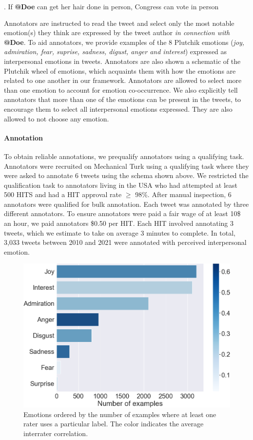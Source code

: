 \ex.\label{ex:doe} If \textbf{@Doe} can get her hair done in person, Congress can vote in person\textellipsis

Annotators are instructed to read the tweet and select only the most notable emotion(s) they think are expressed by the tweet author \emph{in connection with} \textbf{@Doe}. To aid annotators, we provide examples of the 8 Plutchik emotions (\emph{joy, admiration, fear, suprise, sadness, digust, anger and interest}) expressed as interpersonal emotions in tweets. Annotators are also shown a schematic of the Plutchik wheel of emotions, which acquaints them with how the emotions are related to one another in our framework. Annotators are allowed to select more than one emotion to account for emotion co-occurrence. We also explicitly tell annotators that more than one of the emotions can be present in the tweets, to encourage them to select all interpersonal emotions expressed. They are also allowed to not choose any emotion.

\paragraph{Annotation}  To obtain reliable annotations, we prequalify annotators using a qualifying task. Annotators were recruited on Mechanical Turk using a qualifying task where they were asked to annotate 6 tweets using the schema shown above. We restricted the qualification task to annotators living in the USA who had attempted at least 500 HITS and had a HIT approval rate $\geq$ 98\%. After manual inspection, 6 annotators were qualified for bulk annotation. Each tweet was annotated by three different annotators. To ensure annotators were paid a fair wage of at least 10\$ an hour, we paid annotators \$0.50 per HIT. Each HIT involved annotating 3 tweets, which we estimate to take on average 3 minutes to complete.  In total, 3,033 tweets between 2010 and 2021 were annotated with perceived interpersonal emotion.

\begin{figure}[t]
    \centering
    \includegraphics[width=0.85\linewidth]{figures/interrater.png}
    \caption{Emotions ordered by the number of examples where at least one rater uses a particular label. The color indicates the average interrater correlation.}
    \label{fig:interrater-corr}
\end{figure}

